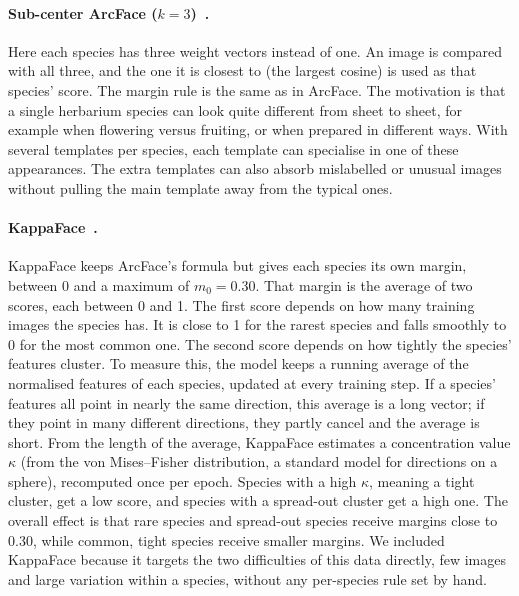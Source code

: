 \documentclass[11pt]{article}
\begin{document}
\paragraph{Sub-center ArcFace ($k=3$)~\citep{subcenter}.} Here each species has three
weight vectors instead of one. An image is compared with all three, and the one it is
closest to (the largest cosine) is used as that species' score. The margin rule is the
same as in ArcFace. The motivation is that a single herbarium species can look quite
different from sheet to sheet, for example when flowering versus fruiting, or when
prepared in different ways. With several templates per species, each template can
specialise in one of these appearances. The extra templates can also absorb mislabelled
or unusual images without pulling the main template away from the typical ones.

\paragraph{KappaFace~\citep{kappaface}.} KappaFace keeps ArcFace's formula but gives each
species its own margin, between 0 and a maximum of $m_0 = 0.30$. That margin is the
average of two scores, each between 0 and 1. The first score depends on how many
training images the species has. It is close to 1 for the rarest species and falls
smoothly to 0 for the most common one. The second score depends on how tightly the
species' features cluster. To measure this, the model keeps a running average of the
normalised features of each species, updated at every training step. If a species'
features all point in nearly the same direction, this average is a long vector; if they
point in many different directions, they partly cancel and the average is short. From
the length of the average, KappaFace estimates a concentration value $\kappa$ (from the
von Mises--Fisher distribution, a standard model for directions on a sphere), recomputed
once per epoch. Species with a high $\kappa$, meaning a tight cluster, get a low score,
and species with a spread-out cluster get a high one. The overall effect is that rare
species and spread-out species receive margins close to 0.30, while common, tight
species receive smaller margins. We included KappaFace because it targets the two
difficulties of this data directly, few images and large variation within a species,
without any per-species rule set by hand.
\end{document}
